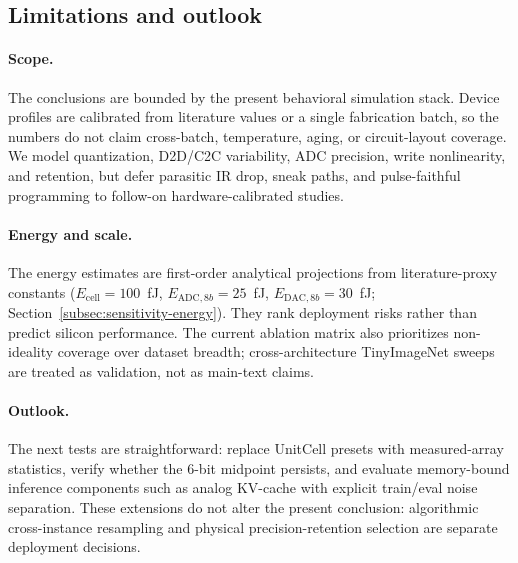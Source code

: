\subsection{Limitations and outlook}
\label{subsec:limitations}

\paragraph{Scope.} The conclusions are bounded by the present behavioral simulation stack. Device profiles are calibrated from literature values or a single fabrication batch, so the numbers do not claim cross-batch, temperature, aging, or circuit-layout coverage. We model quantization, D2D/C2C variability, ADC precision, write nonlinearity, and retention, but defer parasitic IR drop, sneak paths, and pulse-faithful programming to follow-on hardware-calibrated studies.

\paragraph{Energy and scale.} The energy estimates are first-order analytical projections from literature-proxy constants ($E_{\text{cell}}=100$~fJ, $E_{\text{ADC},8b}=25$~fJ, $E_{\text{DAC},8b}=30$~fJ; Section~\ref{subsec:sensitivity-energy}). They rank deployment risks rather than predict silicon performance. The current ablation matrix also prioritizes non-ideality coverage over dataset breadth; cross-architecture TinyImageNet sweeps are treated as validation, not as main-text claims.

\paragraph{Outlook.} The next tests are straightforward: replace UnitCell presets with measured-array statistics, verify whether the 6-bit midpoint persists, and evaluate memory-bound inference components such as analog KV-cache with explicit train/eval noise separation. These extensions do not alter the present conclusion: algorithmic cross-instance resampling and physical precision-retention selection are separate deployment decisions.

